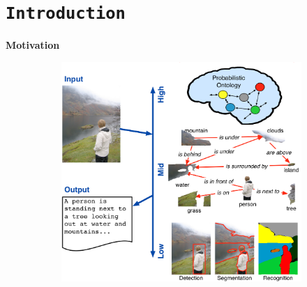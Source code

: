\section{\texttt{Introduction}}
\begin{frame}{\textbf{Motivation}}

\begin{figure}
	\centering
	\begin{subfigure}[c]{0.3\textwidth}
		\includegraphics[width=\textwidth]{./img/motivation1.png} \footnotemark
    \end{subfigure}\hspace{3em}%
    \begin{subfigure}[c]{0.2\textwidth}

\end{subfigure}
\end{figure}
\end{frame}

